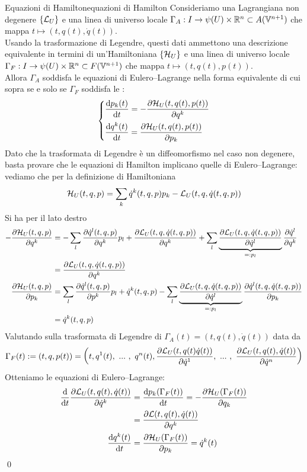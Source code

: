 \documentclass[openany]{book}
\renewcommand\V{\mathbb{V}}
\begin{document}
\begin{theorem}{Equazioni di Hamilton}{equazioni di Hamilton}
    Consideriamo una Lagrangiana non degenere $\{\mathcal{L}_U\}$ e una linea di universo locale $\Gamma_A : I \to \psi(U)\times \R^n\subset A(\V^{n+1})$ che mappa $t\mapsto (t,q(t),\dot q(t))$.\\
    Usando la trasformazione di Legendre, questi dati ammettono una descrizione equivalente in termini di un'Hamiltoniana $\{\mathcal{H}_U\}$ e una linea di universo locale $\Gamma_F:I \to\psi(U)\times \R^n \subset F(\V^{n+1})$ che mappa $t\mapsto (t,q(t),p(t))$.\\
    Allora $\Gamma_A$ soddisfa le equazioni di Eulero--Lagrange nella forma equivalente di cui sopra se e solo se $\Gamma_F$ soddisfa le :
    \[ \begin{dcases}
        \frac{\text{d} p_k(t)}{\text{d} t} = -\frac{\partial \mathcal{H}_U(t,q(t),p(t))}{\partial q^k}\\
        \frac{\text{d} q^k(t)}{\text{d} t} = \frac{\partial \mathcal{H}_U(t,q(t),p(t))}{\partial p_k}
    \end{dcases} \]
    \proof 
    Dato che la trasformata di Legendre è un diffeomorfismo nel caso non degenere, basta provare che le equazioni di Hamilton implicano quelle di Eulero--Lagrange: vediamo che per la definizione di Hamiltoniana 
    \[ \mathcal{H}_U(t,q,p) = \sum_k \dot q^k(t,q,p) p_k -\mathcal{L}_U(t,q,\dot q(t,q,p)) \]
    Si ha per il lato destro
    \begin{align*}
        -\frac{\partial \mathcal{H}_U(t,q,p)}{\partial q^k} & = -\sum_l \frac{\partial \dot q^l(t,q,p)}{\partial q^k}p_l +\frac{\partial \mathcal{L}_U(t,q,\dot q(t,q,p))}{\partial q^k} + \sum_l \underbrace{\frac{\partial \mathcal{L}_U(t,q,\dot q(t,q,p))}{\partial \dot q^l}}_{=: p_l}\frac{\partial \dot q^l}{\partial q^k}\\ 
        & = \frac{\partial \mathcal{L}_U(t,q,\dot q(t,q,p))}{\partial q^k} \\
        \frac{\partial\mathcal{H}_U(t,q,p)}{\partial p_k} & = \sum_l \frac{\partial \dot q^l(t,q,p)}{\partial p^k}p_l + \dot q^k(t,q,p) -\sum_l \underbrace{\frac{\partial \mathcal{L}_U(t,q,\dot q(t,q,p))}{\partial \dot q^l}}_{=: p_l}\frac{\partial \dot q^l(t,q,\dot q(t,q,p))}{\partial p_k} \\
        & = \dot q^k(t,q,p)
    \end{align*}
    Valutando sulla trasformata di Legendre di $\Gamma_A(t) = (t,q(t),\dot q(t))$ data da 
    \[ \Gamma_F(t):= (t,q,p(t)) = \left( t, q^1(t),\ ...\ ,\ q^n(t),\frac{\partial \mathcal{L}_U(t,q(t)\dot q(t))}{\partial \dot q^1},\ ...\ ,\  \frac{\partial \mathcal{L}_U(t,q(t),\dot q(t))}{\partial\dot q^n} \right) \]
    Otteniamo le equazioni di Eulero--Lagrange: 
    \begin{align*}
        \frac{\text{d}}{\text{d} t}\frac{\partial \mathcal{L}_U(t,q(t),\dot q(t))}{\partial \dot q^k} & = \frac{\text{d} p_k(\Gamma_F(t))}{\text{d} t} = - \frac{\partial \mathcal{H}_U(\Gamma_F(t))}{\partial q_k} \\
        & = \frac{\partial \mathcal{L}(t,q(t),\dot q(t))}{\partial q^k} \\
        \frac{\text{d} q^k(t)}{\text{d} t} &  = \frac{\partial \mathcal{H}_U(\Gamma_F(t)) }{\partial p_k} = \dot q^k(t)
    \end{align*}
    \qed
\end{theorem}
\end{document}
